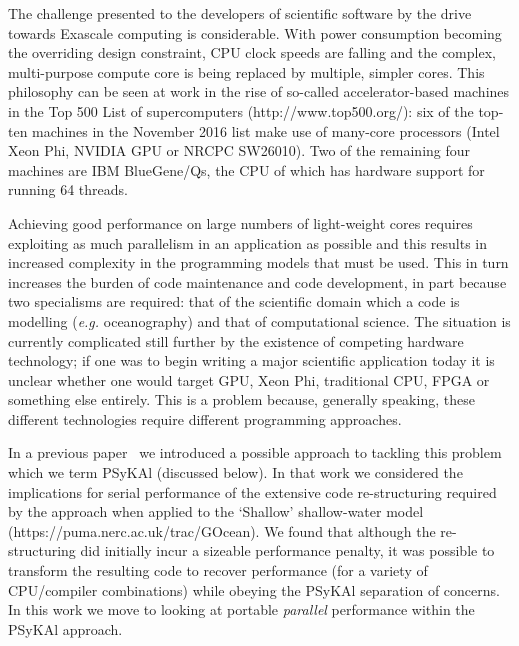 \documentclass[gmd, manuscript]{copernicus}
\begin{document}

\introduction

The challenge presented to the developers of scientific software by
the drive towards Exascale computing is considerable. With power
consumption becoming the overriding design constraint, CPU clock
speeds are falling and the complex, multi-purpose compute core is
being replaced by multiple, simpler cores. This philosophy can be seen
at work in the rise of so-called accelerator-based machines in the Top
500 List of supercomputers (http://www.top500.org/): six of the
top-ten machines in the November 2016 list make use of many-core
processors (Intel Xeon Phi, NVIDIA GPU or NRCPC SW26010). Two of the
remaining four machines are IBM BlueGene/Qs, the CPU of which has
hardware support for running 64 threads.

Achieving good performance on large numbers of light-weight cores
requires exploiting as much parallelism in an application as possible
and this results in increased complexity in the programming models
that must be used. This in turn increases the burden of code
maintenance and code development, in part because two specialisms are
required: that of the scientific domain which a code is modelling
(\textit{e.g.} oceanography) and that of computational science. The
situation is currently complicated still further by the existence of
competing hardware technology; if one was to begin writing a major
scientific application today it is unclear whether one would target
GPU, Xeon Phi, traditional CPU, FPGA or something else entirely. This
is a problem because, generally speaking, these different technologies
require different programming approaches.

In a previous paper~\citep{shallow_psykal} we introduced a possible
approach to tackling this problem which we term {PS}y{KA}l (discussed
below). In that work we considered the implications for serial
performance of the extensive code re-structuring required by the
approach when applied to the `Shallow' shallow-water model
(https://puma.nerc.ac.uk/trac/GOcean). We found that although the
re-structuring did initially incur a sizeable performance penalty, it
was possible to transform the resulting code to recover performance
(for a variety of CPU/compiler combinations) while obeying the
{PS}y{KA}l separation of concerns. In this work we move to looking at
portable \textit{parallel} performance within the {PS}y{KA}l approach.
\end{document}
